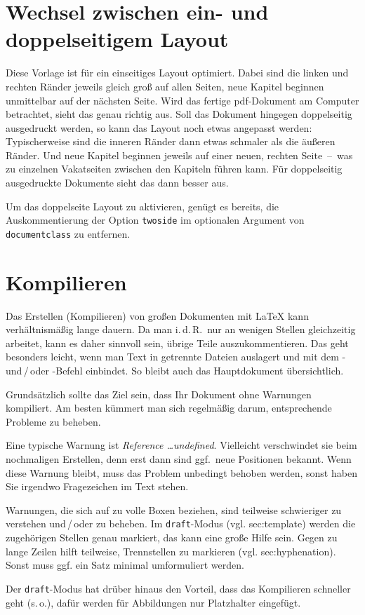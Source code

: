 \section{Wechsel zwischen ein- und doppelseitigem Layout}
Diese Vorlage ist für ein einseitiges Layout optimiert. Dabei sind die linken 
und rechten Ränder jeweils gleich groß auf allen Seiten, neue Kapitel beginnen 
unmittelbar auf
der nächsten Seite. Wird das fertige pdf-Dokument am Computer betrachtet,
sieht das genau richtig aus. Soll das Dokument hingegen doppelseitig 
ausgedruckt werden, so kann das Layout noch etwas angepasst werden: 
Typischerweise sind die inneren Ränder dann etwas schmaler als die äußeren 
Ränder. Und neue Kapitel beginnen jeweils auf einer neuen, rechten
Seite~--~was zu einzelnen Vakatseiten zwischen den Kapiteln führen kann.
Für doppelseitig ausgedruckte Dokumente sieht das dann besser aus.

Um das doppelseite Layout zu aktivieren, genügt es bereits, die 
Auskommentierung der Option \texttt{twoside} im optionalen Argument von 
\texttt{\tb documentclass} zu entfernen.

%
\section{Kompilieren}
\label{sec:compilation}
Das Erstellen (Kompilieren) von großen Dokumenten mit \LaTeX{} kann verhältnismäßig lange dauern. Da man i.\,d.\,R.\ nur an wenigen Stellen gleichzeitig arbeitet, kann es daher sinnvoll sein, übrige Teile auszukommentieren. Das geht besonders leicht, wenn man Text in getrennte Dateien auslagert und mit dem - und\,/\,oder -Befehl einbindet. So bleibt auch das Hauptdokument übersichtlich.
\par
Grundsätzlich sollte das Ziel sein, dass Ihr Dokument ohne Warnungen kompiliert. Am besten kümmert man sich regelmäßig darum, entsprechende Probleme zu beheben.
\par
Eine typische Warnung ist \glqq \emph{Reference \ldots undefined}\grqq{}. Vielleicht verschwindet sie beim nochmaligen Erstellen, denn erst dann sind ggf.\ neue Positionen bekannt. Wenn diese Warnung bleibt, muss das Problem unbedingt behoben werden, sonst haben Sie irgendwo Fragezeichen im Text stehen.
\par
Warnungen, die sich auf zu volle Boxen beziehen, sind teilweise schwieriger zu verstehen und\,/\,oder zu beheben. Im \texttt{draft}-Modus (vgl. sec:template) werden die zugehörigen Stellen genau markiert, das kann eine große Hilfe sein. Gegen zu lange Zeilen hilft teilweise, Trennstellen zu markieren (vgl. sec:hyphenation). Sonst muss ggf. ein Satz minimal umformuliert werden.
\par
Der \texttt{draft}-Modus hat drüber hinaus den Vorteil, dass das Kompilieren schneller geht (s.\,o.), dafür werden für Abbildungen nur Platzhalter eingefügt.
%
%

